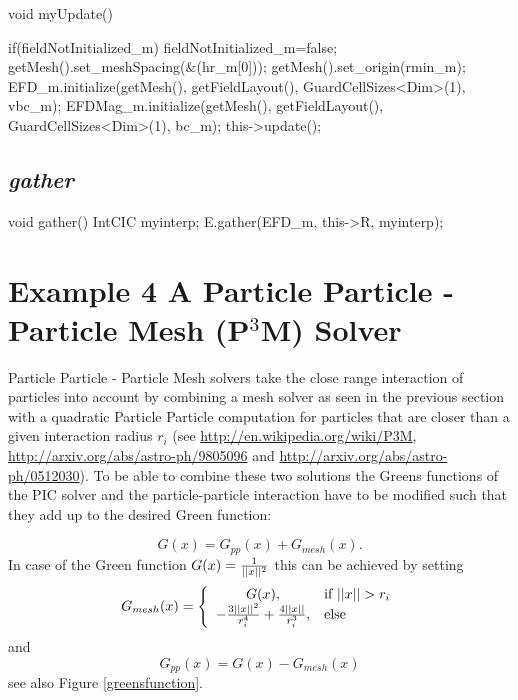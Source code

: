  \begin{code}
void myUpdate() {

    if(fieldNotInitialized_m) {
         fieldNotInitialized_m=false;
         getMesh().set_meshSpacing(&(hr_m[0]));
         getMesh().set_origin(rmin_m);
         EFD_m.initialize(getMesh(), getFieldLayout(), GuardCellSizes<Dim>(1), vbc_m);
         EFDMag_m.initialize(getMesh(), getFieldLayout(), GuardCellSizes<Dim>(1), bc_m);
    }
    this->update();  
}
\end{code}
 
  \subsection{{\em gather}}
 
\begin{code}
void gather() {	
    IntCIC myinterp;
    E.gather(EFD_m, this->R, myinterp);
}
\end{code}
 
 \section{Example 4 A Particle Particle - Particle Mesh (P$^3$M) Solver}
 Particle Particle - Particle Mesh solvers take the close range interaction of particles
into account by combining a mesh solver as seen in the previous section with a quadratic
Particle Particle computation for particles that are closer than a given interaction
radius $r_i$ (see \url{http://en.wikipedia.org/wiki/P3M}, 
\url{http://arxiv.org/abs/astro-ph/9805096} and \url{http://arxiv.org/abs/astro-ph/0512030}).
To be able to combine these two solutions the Greens functions of the PIC solver and the
particle-particle interaction have to be modified such that they add up to the desired
Green function:

\begin{equation}
G(x) = G_{pp}(x) + G_{mesh}(x).
\end{equation}
In case of the Green function $G(x) = {1 \over ||x||^2}$ this can be achieved by setting
\begin{equation}
G_{mesh}(x) = \left\{\begin{array}{cl} G(x), & \mbox{if } ||x||>r_i\\ -{3||x||^2\over r_i^4} + {4||x||\over r_i^3}, & \mbox{else} \end{array}\right.
\end{equation}
and
\begin{equation}
G_{pp}(x) = G(x) - G_{mesh}(x)
\end{equation}
see also Figure \ref{greensfunction}.

